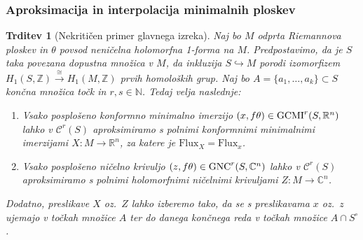 \documentclass[9pt, table]{beamer}
\newtheorem{trditev}{Trditev}
\newcommand{\R}{\mathbb R}
\newcommand{\N}{\mathbb N}
\newcommand{\Z}{\mathbb Z}
\newcommand{\C}{\mathbb C}
\begin{document}
\begin{frame}
\frametitle{Aproksimacija in interpolacija minimalnih ploskev}

\begin{trditev} [Nekritičen primer glavnega izreka]
Naj bo $M$ odprta Riemannova ploskev in $\theta$ povsod neničelna holomorfna 1-forma na $M$.
Predpostavimo, da je $S$ taka povezana dopustna množica v $M$, da inkluzija $S \hookrightarrow M$ porodi izomorfizem $H_{1}(S,\Z) \stackrel{\cong}{\longrightarrow} H_{1}(M,\Z)$ prvih homoloških grup. Naj bo $A=\{a_{1}, \dots , a_{k} \} \subset S$ končna množica točk in $r, s \in \N$. Tedaj velja naslednje:
\begin{enumerate}
\item 
Vsako posplošeno konformno minimalno imerzijo $(x, f\theta) \in \textup{GCMI}^{r}(S,\R^{n})$ lahko v $\mathcal{C}^{r}(S)$ aproksimiramo s polnimi konformnimi minimalnimi imerzijami $X \colon M \to \R^{n}$, za katere je $\mathrm{Flux}_{X} = \mathrm{Flux}_{x}$. 
\item
Vsako posplošeno ničelno krivuljo $(z, f\theta) \in \textup{GNC}^{r}(S,\C^{n})$ lahko v $\mathcal{C}^{r}(S)$ aproksimiramo s polnimi holomorfnimi ničelnimi krivuljami $Z \colon M \to \C^{n}$.
\end{enumerate}
Dodatno, preslikave $X$ oz.~$Z$ lahko izberemo tako, da se s preslikavama $x$ oz.~$z$ ujemajo v točkah množice $A$ ter do danega končnega reda v točkah množice $A \cap S^{\circ}$.
\end{trditev}

\end{frame}

\end{document}
